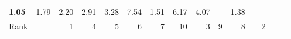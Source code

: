 \begin{tabular}{ll|rrrrrr|rrrrrrr}

  
  \textbf{1.05} & 1.79 & 2.20 & 2.91 & 3.28 & 7.54 & 1.51 & 6.17 & 4.07 &  & 1.38 \\

  Rank & &
  1 & 4 & 5 & 6 & 7 & 10 & 3 & 9 & 8 &  & 2 \\\hline\hline
  

\end{tabular}
